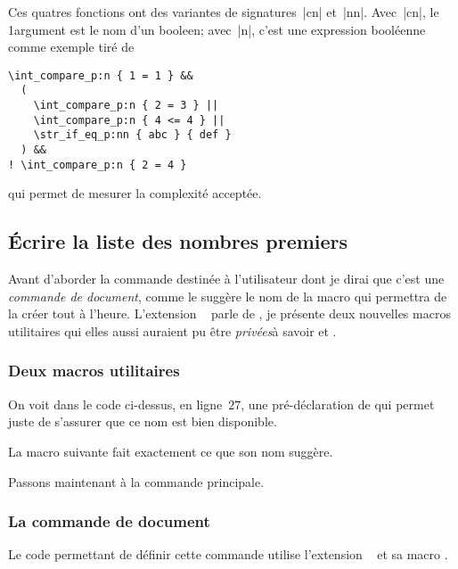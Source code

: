 Ces quatres \glspl{fonction} ont des variantes de signatures~|cn|
et~|nn|. Avec~|cn|, le 1\ier argument est le nom d'un \gls{booleen};
avec~|n|, c'est une expression booléenne comme \TO exemple tiré de
\autocite{l3interfaces}\TF
%
\begin{Verbatim}[frame=lines, framesep=0.75\baselineskip]
\int_compare_p:n { 1 = 1 } &&
  (
    \int_compare_p:n { 2 = 3 } ||
    \int_compare_p:n { 4 <= 4 } ||
    \str_if_eq_p:nn { abc } { def }
  ) &&
! \int_compare_p:n { 2 = 4 }
\end{Verbatim}
%
qui permet de mesurer la complexité acceptée.

\subsection{Écrire la liste des nombres premiers}
\label{sec:ecrirelistepremiers}

Avant d'aborder la commande destinée à l'utilisateur \TO dont je dirai
que c'est une \emph{commande de document}, comme le suggère le nom de
la macro qui permettra de la créer tout à l'heure. L'extension
~\autocite{xparse} parle de \TF, je présente deux nouvelles macros utilitaires \TO
qui elles aussi auraient pu être \emph{privées}\TF à savoir
 et .

\subsubsection{Deux macros utilitaires}


On voit dans le code ci-dessus, en ligne~\(27\), une pré-déclaration
de  qui permet juste de s'assurer que ce
nom est bien disponible.

La macro suivante  fait exactement ce
que son nom suggère. 

Passons maintenant à la commande principale.

\subsubsection{La commande de document}
\label{sec:commandededocument}


Le code permettant de définir cette commande utilise l'extension
~\autocite{xparse} et sa macro .


